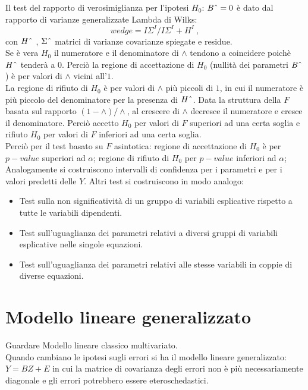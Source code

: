 \documentclass[a4page, 11pt]{article} %
\begin{document}
Il test del rapporto di verosimiglianza per l’ipotesi $H_0$: $B\string^ = 0$ è dato dal rapporto di varianze generalizzate Lambda di Wilks: 
\begin{equation*}
wedge=I\Sigma^{I} /I \Sigma^{I} + H^{I} \ , 
\end{equation*} 
con $H\string^$ , $\Sigma\string^$ matrici di varianze covarianze spiegate e residue.\\
Se è vera $H_0$ il numeratore e il denominatore di $\wedge$ tendono a coincidere poichè $H\string^$ tenderà a $0$. Perciò la regione di accettazione di $H_0$ (nullità dei parametri $B\string^$) è per valori di $\wedge$ vicini all’$1$.\\
La regione di rifiuto di $H_0$ è per valori di $\wedge$ più piccoli di $1$, in cui il numeratore è più piccolo del denominatore per la presenza di $H\string^$.
Data la struttura della $F$ basata sul rapporto $(1- \wedge )/  \wedge$, al crescere di $\wedge$ decresce il numeratore e cresce il denominatore.
Perciò accetto $H_0$ per valori di $F$ superiori ad una certa soglia e rifiuto $H_0$ per valori di $F$ inferiori ad una certa soglia.\\
Perciò per il test basato su $F$ asintotica:
regione di accettazione di $H_0$ è per $p-value$ superiori ad $\alpha$;
regione di rifiuto di $H_0$ per $p-value$ inferiori ad $\alpha$;
Analogamente si costruiscono intervalli di confidenza per i parametri e per i valori predetti delle $Y$.
\newline
Altri test si costruiscono in modo analogo:
\begin{itemize}[noitemsep]
\item Test sulla non significatività di un gruppo di variabili esplicative rispetto a tutte le variabili dipendenti.
\item Test sull’uguaglianza dei parametri relativi a diversi gruppi di variabili esplicative nelle singole equazioni.
\item Test sull'uguaglianza dei parametri relativi alle stesse variabili in coppie di diverse equazioni.
\end{itemize}


\section{Modello lineare generalizzato}

Guardare Modello lineare classico multivariato.\\
Quando cambiano le ipotesi sugli errori si ha il modello lineare generalizzato: $Y = BZ+E$ in cui la matrice di covarianza degli errori non è più necessariamente diagonale e gli errori potrebbero essere eteroschedastici. 
\end{document}
